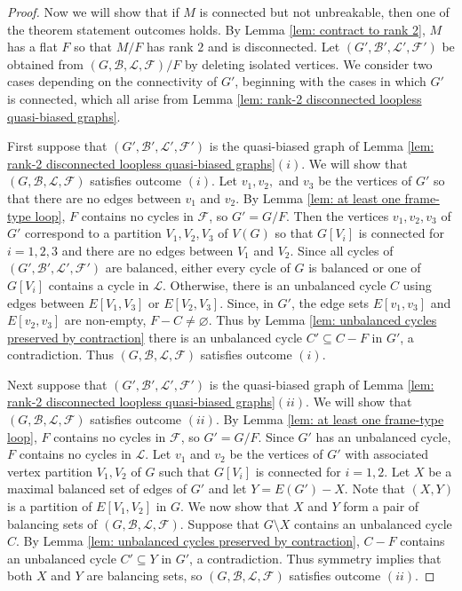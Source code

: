 \documentclass[12pt]{article}
\theoremstyle{definition}
\theoremstyle{plain} %
\newcommand{\cB}{\mathcal{B}}
\newcommand{\cF}{\mathcal{F}}
\newcommand{\cL}{\mathcal{L}}
\newcommand{\del}{\!\setminus\!}
\newcommand{\qbg}{\ensuremath{(G,\cB,\cL,\cF)}}
\newcommand{\qbgp}{\ensuremath{(G',\cB',\cL',\cF')}}
\begin{document}
\begin{proof}
Now we will show that if $M$ is connected but not unbreakable, then one of the theorem statement outcomes holds. By Lemma \ref{lem: contract to rank 2}, $M$ has a flat $F$ so that $M/F$ has rank $2$ and is disconnected. 
Let $(G', \cB', \cL', \cF')$ be obtained from $(G, \cB, \cL, \cF)/F$ by deleting isolated vertices. We consider two cases depending on the connectivity of $G'$, beginning with the cases in which $G'$ is connected, which all arise from Lemma \ref{lem: rank-2 disconnected loopless quasi-biased graphs}.

First suppose that $(G',\cB',\cL',\cF')$ is the quasi-biased graph of Lemma \ref{lem: rank-2 disconnected loopless quasi-biased graphs}$(i)$. We will show that $\qbg$ satisfies outcome $(i)$. Let $v_1,v_2,$ and $v_3$ be the vertices of $G'$ so that there are no edges between $v_1$ and $v_2$. By Lemma \ref{lem: at least one frame-type loop}, $F$ contains no cycles in $\cF$, so $G'=G/F$. Then the vertices $v_1,v_2,v_3$ of $G'$ correspond to a partition $V_1,V_2,V_3$ of $V(G)$ so that $G[V_i]$ is connected for $i=1,2,3$ and there are no edges between $V_1$ and $V_2$. 
Since all cycles of $\qbgp$ are balanced, either every cycle of $G$ is balanced or one of $G[V_i]$ contains a cycle in $\cL$. Otherwise, there is an unbalanced cycle $C$ using edges between $E[V_1,V_3]$ or $E[V_2,V_3]$. Since, in $G'$, the edge sets $E[v_1,v_3]$ and $E[v_2,v_3]$ are non-empty, $F-C\neq\varnothing$. Thus by Lemma \ref{lem: unbalanced cycles preserved by contraction} there is an unbalanced cycle $C'\subseteq C-F$ in $G'$, a contradiction. Thus $\qbg$ satisfies outcome $(i)$.

Next suppose that $\qbgp$ is the quasi-biased graph of Lemma \ref{lem: rank-2 disconnected loopless quasi-biased graphs}$(ii)$. We will show that $\qbg$ satisfies outcome $(ii)$. By Lemma \ref{lem: at least one frame-type loop}, $F$ contains no cycles in $\cF$, so $G'=G/F$. Since $G'$ has an unbalanced cycle, $F$ contains no cycles in $\cL$. Let $v_1$ and $v_2$ be the vertices of $G'$ with associated vertex partition $V_1,V_2$ of $G$ such that $G[V_i]$ is connected for $i=1,2$. Let $X$ be a maximal balanced set of edges of $G'$ and let $Y=E(G')-X$. Note that $(X,Y)$ is a partition of $E[V_1,V_2]$ in $G$. We now show that $X$ and $Y$ form a pair of balancing sets of $(G,\cB,\cL,\cF)$. Suppose that $G\del X$ contains an unbalanced cycle $C$. By Lemma \ref{lem: unbalanced cycles preserved by contraction}, $C-F$ contains an unbalanced cycle $C'\subseteq Y$ in $G'$, a contradiction. Thus symmetry implies that both $X$ and $Y$ are balancing sets, so $\qbg$ satisfies outcome $(ii)$.



\end{proof}
\end{document}
